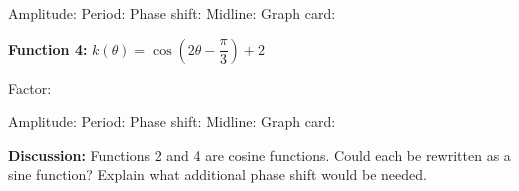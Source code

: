 \documentclass[10pt]{article}
\begin{document}
\begin{tcolorbox}[colback=white, colframe=black!40,
    title=\textbf{Tier A --- Apply},
    fonttitle=\bfseries, arc=2mm, left=3mm, right=3mm, top=2mm, bottom=2mm]
\vspace{4pt}
Amplitude: \underline{\hspace{1.5cm}} \quad Period: \underline{\hspace{1.5cm}} \quad
Phase shift: \underline{\hspace{2.5cm}} \quad Midline: \underline{\hspace{1.5cm}} \quad Graph card: \underline{\hspace{0.8cm}}

\vspace{8pt}
\textbf{Function 4:} $k(\theta) = \cos\!\left(2\theta - \dfrac{\pi}{3}\right) + 2$

\vspace{4pt}
Factor: \underline{\hspace{4cm}}

\vspace{4pt}
Amplitude: \underline{\hspace{1.5cm}} \quad Period: \underline{\hspace{1.5cm}} \quad
Phase shift: \underline{\hspace{2.5cm}} \quad Midline: \underline{\hspace{1.5cm}} \quad Graph card: \underline{\hspace{0.8cm}}

\vspace{8pt}
\textbf{Discussion:} Functions 2 and 4 are cosine functions. Could each be rewritten as
a sine function? Explain what additional phase shift would be needed.


\end{tcolorbox}

\vspace{0.08in}
\end{document}
